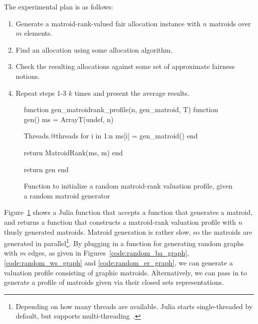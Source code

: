 The experimental plan is as follows:
\begin{enumerate}
  \item Generate a matroid-rank-valued fair allocation instance with $n$ matroids over $m$ elements.
  \item Find an allocation using some allocation algorithm.
  \item Check the resulting allocations against some set of approximate fairness notions.
  \item Repeat steps 1-3 $k$ times and present the average results.
\end{enumerate}

\begin{figure}
  \begin{jllisting}
function gen_matroidrank_profile(n, gen_matroid, T)
  function gen()
    ms = Array{T}(undef, n)

    Threads.@threads for i in 1:n
      ms[i] = gen_matroid()
    end

    return MatroidRank(ms, m)
  end

  return gen
end
  \end{jllisting}
  \caption{Function to initialize a random matroid-rank valuation profile, given a random matroid generator}
  \label{code:gen_matroidrank_profile}
\end{figure}

Figure~\ref{code:gen_matroidrank_profile} shows a Julia function that accepts a function that generates a matroid, and returns a function that constructs a matroid-rank valuation profile with $n$ thusly generated matroids. Matroid generation is rather slow, so the matroids are generated in parallel\footnote{Depending on how many threads are available. Julia starts single-threaded by default, but supports multi-threading~\cite{bezanson2017julia}.}. By plugging in a function for generating random graphs with $m$ edges, as given in Figures~\ref{code:random_ba_graph}, \ref{code:random_ws_graph} and \ref{code:random_er_graph}, we can generate a valuation profile consisting of graphic matroids. Alternatively, we can pass in  to generate a profile of matroids given via their closed sets representations. 